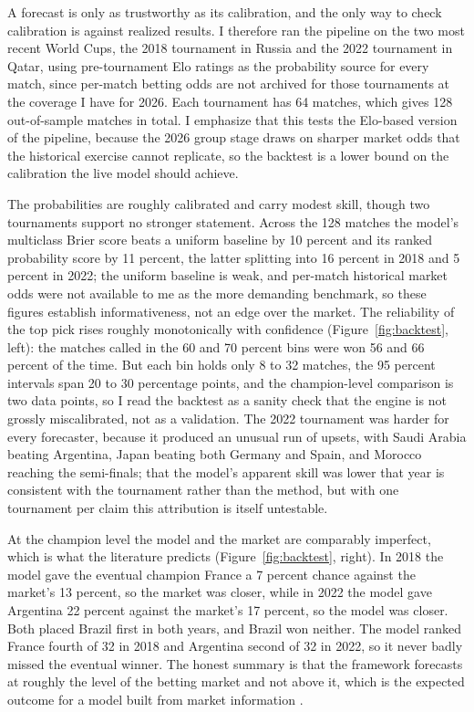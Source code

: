\documentclass[11pt,a4paper]{article}
\begin{document}
A forecast is only as trustworthy as its calibration, and the only way to check calibration is against realized results. I therefore ran the pipeline on the two most recent World Cups, the 2018 tournament in Russia and the 2022 tournament in Qatar, using pre-tournament Elo ratings as the probability source for every match, since per-match betting odds are not archived for those tournaments at the coverage I have for 2026. Each tournament has 64 matches, which gives 128 out-of-sample matches in total. I emphasize that this tests the Elo-based version of the pipeline, because the 2026 group stage draws on sharper market odds that the historical exercise cannot replicate, so the backtest is a lower bound on the calibration the live model should achieve.

The probabilities are roughly calibrated and carry modest skill, though two tournaments support no stronger statement. Across the 128 matches the model's multiclass Brier score beats a uniform baseline by 10 percent and its ranked probability score \citep{constantinou2012} by 11 percent, the latter splitting into 16 percent in 2018 and 5 percent in 2022; the uniform baseline is weak, and per-match historical market odds were not available to me as the more demanding benchmark, so these figures establish informativeness, not an edge over the market. The reliability of the top pick rises roughly monotonically with confidence (Figure~\ref{fig:backtest}, left): the matches called in the 60 and 70 percent bins were won 56 and 66 percent of the time. But each bin holds only 8 to 32 matches, the 95 percent intervals span 20 to 30 percentage points, and the champion-level comparison is two data points, so I read the backtest as a sanity check that the engine is not grossly miscalibrated, not as a validation. The 2022 tournament was harder for every forecaster, because it produced an unusual run of upsets, with Saudi Arabia beating Argentina, Japan beating both Germany and Spain, and Morocco reaching the semi-finals; that the model's apparent skill was lower that year is consistent with the tournament rather than the method, but with one tournament per claim this attribution is itself untestable.

At the champion level the model and the market are comparably imperfect, which is what the literature predicts (Figure~\ref{fig:backtest}, right). In 2018 the model gave the eventual champion France a 7 percent chance against the market's 13 percent, so the market was closer, while in 2022 the model gave Argentina 22 percent against the market's 17 percent, so the model was closer. Both placed Brazil first in both years, and Brazil won neither. The model ranked France fourth of 32 in 2018 and Argentina second of 32 in 2022, so it never badly missed the eventual winner. The honest summary is that the framework forecasts at roughly the level of the betting market and not above it, which is the expected outcome for a model built from market information \citep{strumbelj2014, hvattum2010}.
\end{document}
